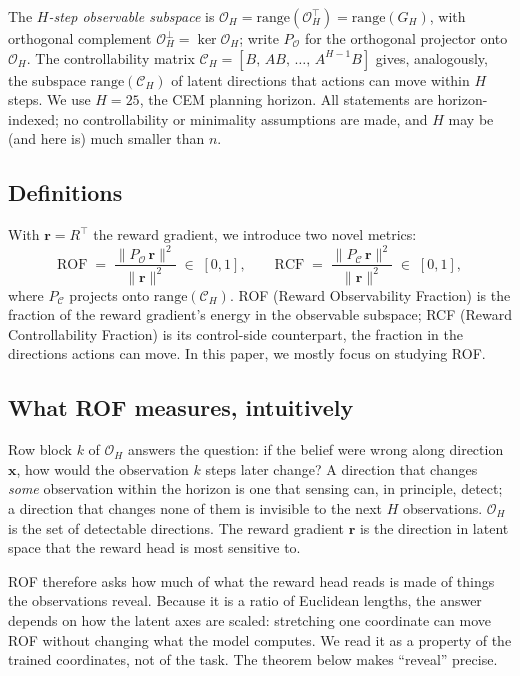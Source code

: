 \documentclass[11pt]{article}
\newcommand{\norm}[1]{\lVert #1 \rVert}
\newcommand{\Obs}{\mathcal{O}}
\newcommand{\ROF}{\mathrm{ROF}}
\newcommand{\RCF}{\mathrm{RCF}}
\theoremstyle{remark}
\begin{document}
The \emph{$H$-step observable subspace} is $\Obs_H = \mathrm{range}(\mathcal{O}_H^\top) = \mathrm{range}(G_H)$, with orthogonal complement $\Obs_H^\perp = \ker \mathcal{O}_H$; write $P_{\Obs}$ for the orthogonal projector onto $\Obs_H$. The controllability matrix $\mathcal{C}_H = [B,\, AB,\, \dots,\, A^{H-1} B]$ gives, analogously, the subspace $\mathrm{range}(\mathcal{C}_H)$ of latent directions that actions can move within $H$ steps. We use $H{=}25$, the CEM planning horizon. All statements are horizon-indexed; no controllability or minimality assumptions are made, and $H$ may be (and here is) much smaller than $n$.

\subsection{Definitions}

With $\bm{r} = R^\top$ the reward gradient, we introduce two novel metrics:
\begin{equation}
  \ROF \;=\; \frac{\norm{P_{\Obs}\, \bm{r}}^2}{\norm{\bm{r}}^2} \;\in\; [0,1],
  \qquad
  \RCF \;=\; \frac{\norm{P_{\mathcal{C}}\, \bm{r}}^2}{\norm{\bm{r}}^2} \;\in\; [0,1],
  \label{eq:rof}
\end{equation}
where $P_{\mathcal{C}}$ projects onto $\mathrm{range}(\mathcal{C}_H)$. ROF (Reward Observability Fraction) is the fraction of the reward gradient's energy in the observable subspace; RCF (Reward Controllability Fraction) is its control-side counterpart, the fraction in the directions actions can move. In this paper, we mostly focus on studying ROF.

\subsection{What ROF measures, intuitively}

Row block $k$ of $\mathcal{O}_H$ answers the question: if the belief were wrong along direction $\bm{x}$, how would the observation $k$ steps later change? A direction that changes \emph{some} observation within the horizon is one that sensing can, in principle, detect; a direction that changes none of them is invisible to the next $H$ observations. $\Obs_H$ is the set of detectable directions. The reward gradient $\bm{r}$ is the direction in latent space that the reward head is most sensitive to.

ROF therefore asks how much of what the reward head reads is made of things the observations reveal. Because it is a ratio of Euclidean lengths, the answer depends on how the latent axes are scaled: stretching one coordinate can move ROF without changing what the model computes. We read it as a property of the trained coordinates, not of the task. The theorem below makes ``reveal'' precise.
\end{document}
